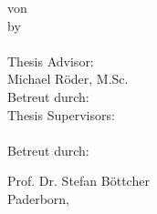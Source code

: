 \begin{titlepage}
\begin{center}
		\ifgerman
			von\\
		\else
			by\\
		\fi 
		{\Large\textsc{\theauthor{}}}\\[60pt]
		
		Thesis Advisor:\\[8pt]
		
		{\large Michael Röder, M.Sc.}\\[30pt]

		\ifgerman
			Betreut durch:\\
		\else
			Thesis Supervisors:\\[8pt]
		\fi 
		{\large \thesupervisor{}}\\[5pt]
		
		\ifgerman
		Betreut durch:\\
		\else
	    
		\fi 
		{\large Prof. Dr. Stefan Böttcher}\\[30pt]

		Paderborn, \thesubmissiondate{}
	\end{center}
\end{titlepage}
